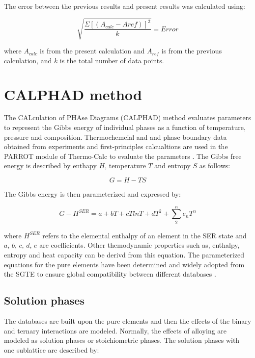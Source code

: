The error between the previous results and present results was calculated using:

\begin{equation}
\label{eq: error}
\sqrt{\frac{\Sigma[(A_{calc}-A{ref})]^{2}}{k}} = Error
\end{equation}

where $A_{calc}$ is from the present calculation and $A_{ref}$ is from the previous calculation, and $k$ is the total number of data points. 

\section{CALPHAD method}

The CALculation of PHAse Diagrams (CALPHAD) method evaluates parameters to represent the Gibbs energy of individual phases as a function of temperature, pressure and composition. Thermochemcial and and phase boundary data obtained from experiments and first-principles calcualtions are used in the PARROT module of Thermo-Calc to evaluate the parameters \cite{Andersson2002}. The Gibbs free energy is described by enthapy $H$, temperature $T$ and entropy $S$ as follows:

\begin{equation}
\label{eq: gibbs}
G = H - T S 
\end{equation}

The Gibbs energy is then parameterized and expressed by:

\begin{equation}
\label{eq: parameterizaiton}
G - H^{SER} = a + bT + cT ln T + d T^2 + \sum_{2}^{n} e_{n} T^{n}
\end{equation}

where $H^{SER}$ refers to the elemental enthalpy of an element in the SER state and $a$, $b$, $c$, $d$, $e$ are coefficients. Other themodynamic properties such as, enthalpy, entropy and heat capacity can be derivd from this equation. The parameterized equations for the pure elements have been determined and widely adopted from the SGTE to ensure global compatibility between different databases \cite{Dinsdale1991}. 

\subsection{Solution phases}

The databases are built upon the pure elements and then the effects of the binary and ternary interactions are modeled. Normally, the effects of alloying are modeled as solution phases or stoichiometric phases. The solution phases with one sublattice are described by: 


